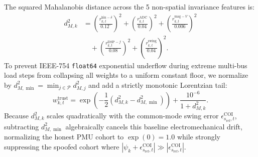 \documentclass[journal,twoside]{IEEEtran}
\begin{document}
The squared Mahalanobis distance across the 5 non-spatial invariance features is:
\begin{equation}
\begin{aligned}
d_{M,k}^2 &= \left(\frac{r_{k,t}^{\mathrm{kin}-\delta}}{0.12^\circ}\right)^2 + \left(\frac{r_{k,t}^{\mathrm{ADC}}}{0.04}\right)^2 + \left(\frac{r_{k,t}^{\mathrm{mag}-V}}{0.006}\right)^2 \\
&\quad + \left(\frac{r_{k,t}^{\mathrm{DSP}-f}}{0.08}\right)^2 + \left(\frac{r_{k,t}^{\mathrm{swing}}}{0.04}\right)^2.
\end{aligned}
\label{eq:mahal}
\end{equation}
To prevent IEEE-754 \texttt{float64} exponential underflow during extreme multi-bus load steps from collapsing all weights to a uniform constant floor, we normalize by $d_{M,\min}^2 = \min_{j \in \mathcal{P}} d_{M,j}^2$ and add a strictly monotonic Lorentzian tail:
\begin{equation}
w_{k,t}^{\mathrm{trust}} = \exp\left(-\frac{1}{2}\left(d_{M,k}^2 - d_{M,\min}^2\right)\right) + \frac{10^{-6}}{1 + d_{M,k}^2}.
\label{eq:trust_weight}
\end{equation}
Because $d_{M,k}^2$ scales quadratically with the common-mode swing error $\epsilon_{s_{\mathrm{ref}},t}^{\mathrm{COI}}$, subtracting $d_{M,\min}^2$ algebraically cancels this baseline electromechanical drift, normalizing the honest PMU cohort to $\exp(0) = 1.0$ while strongly suppressing the spoofed cohort where $|\psi_k + \epsilon_{s_{\mathrm{ref}},t}^{\mathrm{COI}}| \gg |\epsilon_{s_{\mathrm{ref}},t}^{\mathrm{COI}}|$.
\end{document}
